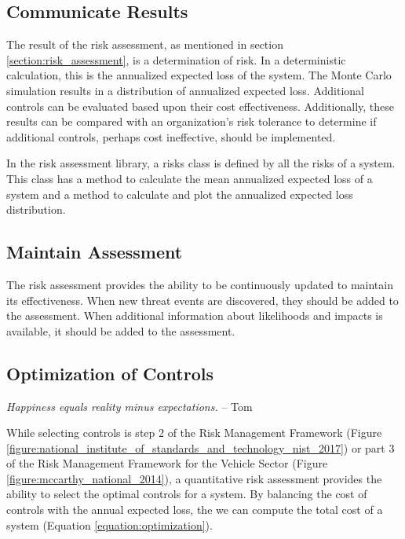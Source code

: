 \documentclass{article}
\begin{document}
\subsection{Communicate Results}

The result of the risk assessment, as mentioned in section \ref{section:risk_assessment}, is a determination of risk. In a deterministic calculation, this is the annualized expected loss of the system. The Monte Carlo simulation results in a distribution of annualized expected loss. Additional controls can be evaluated based upon their cost effectiveness. Additionally, these results can be compared with an organization's risk tolerance to determine if additional controls, perhaps cost ineffective, should be implemented.

In the risk assessment library, a risks class is defined by all the risks of a system. This class has a method to calculate the mean annualized expected loss of a system and a method to calculate and plot the annualized expected loss distribution.

\subsection{Maintain Assessment}

The risk assessment provides the ability to be continuously updated to maintain its effectiveness. When new threat events are discovered, they should be added to the assessment. When additional information about likelihoods and impacts is available, it should be added to the assessment.

\subsection{Optimization of Controls}

\begin{mdframed} \centering
    \emph{Happiness equals reality minus expectations.} -- Tom \cite{magliozzi_car_nodate}
\end{mdframed}

\noindent While selecting controls is step 2 of the Risk Management Framework (Figure \ref{figure:national_institute_of_standards_and_technology_nist_2017}) or part 3 of the Risk Management Framework for the Vehicle Sector (Figure \ref{figure:mccarthy_national_2014}), a quantitative risk assessment provides the ability to select the optimal controls for a system. By balancing the cost of controls with the annual expected loss, the we can compute the total cost of a system (Equation \ref{equation:optimization}). 
\end{document}
